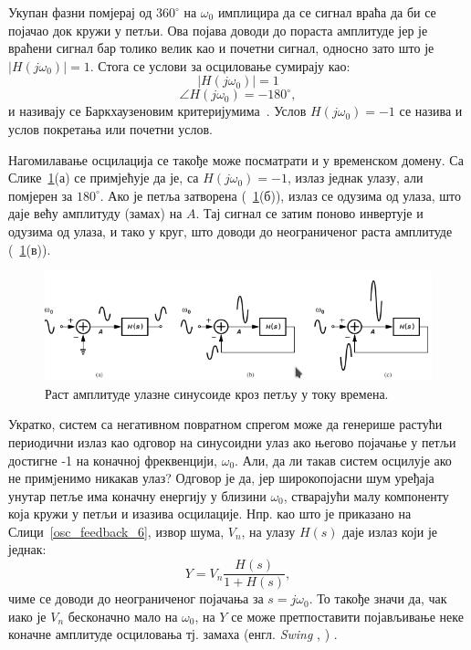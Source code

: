 \documentclass[master]{finthesis}
\makeatletter
\newcommand*{\engl}[2][\@empty]{%
    \edef\theacronym{#1}%
    (енгл. \foreignlanguage{english}{\emph{#2}%
    \ifx\theacronym\@empty \else , #1\fi})%
}
\makeatother
\begin{document}
Укупан фазни помјерај од $360^{\circ}$ на $\omega_{0}$ имплицира да се сигнал враћа да би се појачао док кружи у петљи. Ова појава доводи до пораста амплитуде јер је враћени сигнал бар толико велик као и почетни сигнал, односно зато што је $|H(j\omega_{0})|=1$. Стога се услови за осциловање сумирају као:
\begin{equation} 
	\label{osc_condition_1}
	|H(j\omega_{0})| = 1
\end{equation}
\begin{equation} 
	\label{osc_condition_2}
	\angle H(j\omega_{0}) = -180^{\circ},
\end{equation}
и називају се Баркхаузеновим критеријумима~\cite{Razavi:PLL_CMOS_2020}. Услов $H(j\omega_{0})=-1$ се назива и услов покретања или почетни услов. \par
Нагомилавање осцилација се такође може посматрати и у временском домену. Са Слике~\ref{osc_feedback_5}(а) се примјећује да је, са $H(j\omega_{0})=-1$, излаз једнак улазу, али помјерен за $180^{\circ}$. Ако је петља затворена (\figurename~\ref{osc_feedback_5}(б)), излаз се одузима од улаза, што даје већу амплитуду (замах) на $A$. Тај сигнал се затим поново инвертује и одузима од улаза, и тако у круг, што доводи до неограниченог раста амплитуде (\figurename~\ref{osc_feedback_5}(в)). \par
\begin{figure}[!ht]
	 \centering
	 \includegraphics[scale=0.65]{slike/osc_feedback_5.png}
	 \caption{Раст амплитуде улазне синусоиде кроз петљу у току времена.}
	 \label{osc_feedback_5}
\end{figure}
%
Укратко, систем са негативном повратном спрегом може да генерише растући периодични излаз као одговор на синусоидни улаз ако његово појачање у петљи достигне -1 на коначној фреквенцији, $\omega_{0}$. Али, да ли такав систем осцилује ако не примjенимо никакав улаз? Одговор је да, јер широкопојасни шум уређаја унутар петље има коначну енергију у близини $\omega_{0}$, стварајући малу компоненту која кружи у петљи и изазива осцилације. Нпр. као што је приказано на Слици~\ref{osc_feedback_6}, извор шума, $V_{n}$, на улазу $H(s)$ даје излаз који је једнак:
\begin{equation} 
	\label{osc_feedback_eq_8}
	Y = V_{n}\frac{H(s)}{1+H(s)},
\end{equation}
чиме се доводи до неограниченог појачања за $s=j\omega_{0}$. То такође значи да, чак иако је $V_{n}$ бесконачно мало на $\omega_{0}$, на $Y$ се може претпоставити појављивање неке коначне амплитуде осциловања тј. замаха \engl{Swing}.
\end{document}
